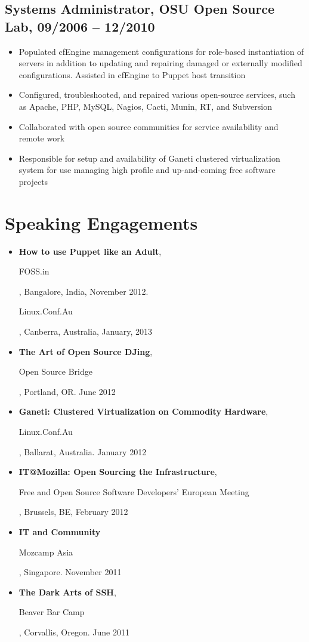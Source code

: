 \documentclass[a4paper,12pt]{report}
\begin{document}
\subsection*{Systems Administrator, OSU Open Source Lab, 09/2006 -- 12/2010}
\begin{itemize} \itemsep -0.25em
\item Populated cfEngine management configurations for role-based instantiation of servers in addition to updating and repairing damaged or externally modified configurations. Assisted in cfEngine to Puppet host transition
\item Configured, troubleshooted, and repaired various open-source services, such as Apache, PHP, MySQL, Nagios, Cacti, Munin, RT, and Subversion
\item Collaborated with open source communities for service availability and remote work
\item Responsible for setup and availability of Ganeti clustered virtualization system for use managing high profile and up-and-coming free software projects
\end{itemize}


\section*{Speaking Engagements}
\begin{itemize} \itemsep -0.25em
\item \textbf{How to use Puppet like an Adult}, \begin{it}FOSS.in\end{it}, Bangalore, India, November 2012. \begin{it}Linux.Conf.Au\end{it}, Canberra, Australia, January, 2013
\item \textbf{The Art of Open Source DJing}, \begin{it}Open Source Bridge\end{it}, Portland, OR. June 2012
\item \textbf{Ganeti: Clustered Virtualization on Commodity Hardware}, \begin{it}Linux.Conf.Au\end{it}, Ballarat, Australia. January 2012
\item \textbf{IT@Mozilla: Open Sourcing the Infrastructure}, \begin{it}Free and Open Source Software Developers' European Meeting\end{it}, Brussels, BE, February 2012
\item \textbf{IT and Community} \begin{it}Mozcamp Asia\end{it}, Singapore. November 2011
\item \textbf{The Dark Arts of SSH}, \begin{it}Beaver Bar Camp\end{it}, Corvallis, Oregon. June 2011
\end{itemize}
\end{document}
